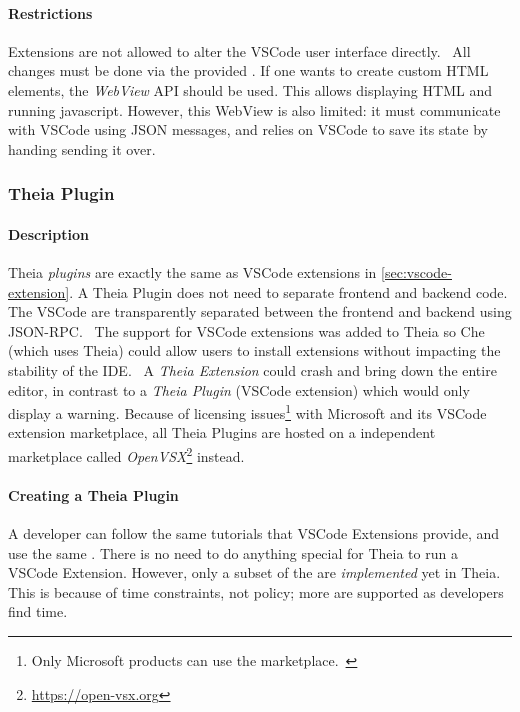 \paragraph*{Restrictions}
Extensions are not allowed to alter the VSCode user interface directly.~\cite{microsoftExtensionsCapabilitiesOverview2020}
All changes must be done via the provided .
If one wants to create custom HTML elements, the \emph{WebView} \acrshort{API} should be used.
This allows displaying HTML and running javascript.
However, this WebView is also limited: it must communicate with VSCode using \gls{JSON} messages, and relies on VSCode to save its state by handing sending it over.~\cite{microsoftWebviewAPI2020}



\subsubsection{Theia Plugin}

\paragraph*{Description} \Gls{Theia} \emph{plugins} are exactly the same as VSCode extensions in \cref{sec:vscode-extension}.
A Theia Plugin does not need to separate frontend and backend code.
The VSCode  are transparently separated between the frontend and backend using \gls{JSON-RPC}.~\cite{paulmarechalTheiaPluginImplementation2020}
The support for VSCode extensions was added to Theia so \gls{Che} (which uses Theia) could allow users to install extensions without impacting the stability of the \acrshort{IDE}.~\cite{helmingEclipseTheiaExtensions2019}
A \emph{Theia Extension} could crash and bring down the entire editor, in contrast to a \emph{Theia Plugin} (VSCode extension) which would only display a warning.
Because of licensing issues\footnote{Only Microsoft products can use the marketplace.~\cite{svenefftingeOpenVSX2020}} with Microsoft and its VSCode extension marketplace, all Theia Plugins are hosted on a independent marketplace called \emph{OpenVSX}\footnote{\href{https://open-vsx.org}{https://open-vsx.org}} instead.~\cite{svenefftingeOpenVSX2020}

\paragraph*{Creating a Theia Plugin}
A developer can follow the same tutorials that VSCode Extensions provide, and use the same .
There is no need to do anything special for Theia to run a VSCode Extension.
However, only a subset of the  are \emph{implemented} yet in Theia.
This is because of time constraints, not policy; more  are supported as developers find time.

